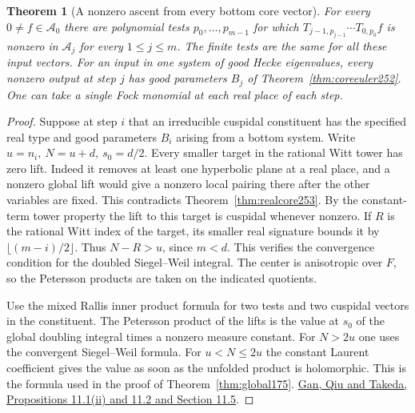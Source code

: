 \documentclass[a4paper,11pt]{article}
\newtheorem{theorem}[proposition]{Theorem}
\theoremstyle{definition}
\theoremstyle{remark}
\numberwithin{equation}{section}
\begin{document}
\begin{theorem}[A nonzero ascent from every bottom core vector]\leavevmode
\label{thm:upcore254}
For every \(0\ne f\in\mathcal A_0\) there are polynomial tests
\(p_0,\ldots,p_{m-1}\) for which \(T_{j-1,p_{j-1}}\cdots T_{0,p_0}f\)
is nonzero in \(\mathcal A_j\) for every \(1\le j\le m\).
The finite tests are the same for all these input vectors.
For an input in one system of good Hecke eigenvalues, every
nonzero output at step \(j\) has good parameters \(B_j\) of
Theorem~\ref{thm:coreeuler252}. One can take a single Fock
monomial at each real place of each step.
\end{theorem}
\begin{proof}
Suppose at step \(i\) that an irreducible cuspidal constituent
has the specified real type and good parameters \(B_i\) arising
from a bottom system. Write \(u=n_i,\ N=u+d,\ s_0=d/2\).
Every smaller target in the rational Witt tower has zero lift.
Indeed it removes at least one hyperbolic plane at a real place,
and a nonzero global lift would give a nonzero local pairing
there after the other variables are fixed. This contradicts
Theorem~\ref{thm:realcore253}. By the constant-term tower property
the lift to this target is cuspidal whenever nonzero. If \(R\)
is the rational Witt index of the target, its smaller real
signature bounds it by \(\lfloor(m-i)/2\rfloor\). Thus
\(N-R>u\), since \(m<d\). This verifies the convergence
condition for the doubled Siegel--Weil integral. The center
is anisotropic over \(F\), so the Petersson products are taken
on the indicated quotients.

Use the mixed Rallis inner product formula for two tests and two
cuspidal vectors in the constituent. The Petersson product of
the lifts is the value at \(s_0\) of the global doubling integral
times a nonzero measure constant. For \(N>2u\) one uses the
convergent Siegel--Weil formula. For \(u<N\le2u\) the constant
Laurent coefficient gives the value as soon as the unfolded
product is holomorphic. This is the formula used in the proof
of Theorem~\ref{thm:global175}.
\href{https://arxiv.org/pdf/1207.4709}{Gan, Qiu and Takeda,
Propositions 11.1(ii) and 11.2 and Section 11.5}.


\end{proof}
\end{document}
